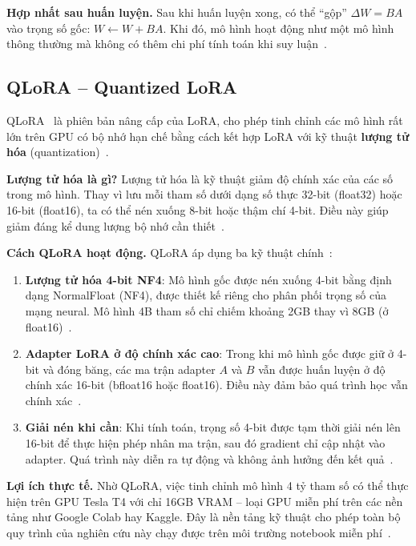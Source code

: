 \textbf{Hợp nhất sau huấn luyện.} Sau khi huấn luyện xong, có thể ``gộp'' $\Delta W = BA$ vào trọng số gốc: $W \leftarrow W + BA$. Khi đó, mô hình hoạt động như một mô hình thông thường mà không có thêm chi phí tính toán khi suy luận~\cite{lightning_lora}.

\subsection{QLoRA -- Quantized LoRA}

QLoRA~\cite{dettmers2023qlora} là phiên bản nâng cấp của LoRA, cho phép tinh chỉnh các mô hình rất lớn trên GPU có bộ nhớ hạn chế bằng cách kết hợp LoRA với kỹ thuật \textbf{lượng tử hóa} (quantization)~\cite{hf_qlora}.

\textbf{Lượng tử hóa là gì?} Lượng tử hóa là kỹ thuật giảm độ chính xác của các số trong mô hình. Thay vì lưu mỗi tham số dưới dạng số thực 32-bit (float32) hoặc 16-bit (float16), ta có thể nén xuống 8-bit hoặc thậm chí 4-bit. Điều này giúp giảm đáng kể dung lượng bộ nhớ cần thiết~\cite{hf_quantization}.

\textbf{Cách QLoRA hoạt động.} QLoRA áp dụng ba kỹ thuật chính~\cite{dettmers2023qlora}:

\begin{enumerate}
    \item \textbf{Lượng tử hóa 4-bit NF4}: Mô hình gốc được nén xuống 4-bit bằng định dạng NormalFloat (NF4), được thiết kế riêng cho phân phối trọng số của mạng neural. Mô hình 4B tham số chỉ chiếm khoảng 2GB thay vì 8GB (ở float16)~\cite{hf_qlora}.

    \item \textbf{Adapter LoRA ở độ chính xác cao}: Trong khi mô hình gốc được giữ ở 4-bit và đóng băng, các ma trận adapter $A$ và $B$ vẫn được huấn luyện ở độ chính xác 16-bit (bfloat16 hoặc float16). Điều này đảm bảo quá trình học vẫn chính xác~\cite{lightning_lora}.

    \item \textbf{Giải nén khi cần}: Khi tính toán, trọng số 4-bit được tạm thời giải nén lên 16-bit để thực hiện phép nhân ma trận, sau đó gradient chỉ cập nhật vào adapter. Quá trình này diễn ra tự động và không ảnh hưởng đến kết quả~\cite{hf_qlora}.
\end{enumerate}

\textbf{Lợi ích thực tế.} Nhờ QLoRA, việc tinh chỉnh mô hình 4 tỷ tham số có thể thực hiện trên GPU Tesla T4 với chỉ 16GB VRAM -- loại GPU miễn phí trên các nền tảng như Google Colab hay Kaggle. Đây là nền tảng kỹ thuật cho phép toàn bộ quy trình của nghiên cứu này chạy được trên môi trường notebook miễn phí~\cite{hf_peft}.

